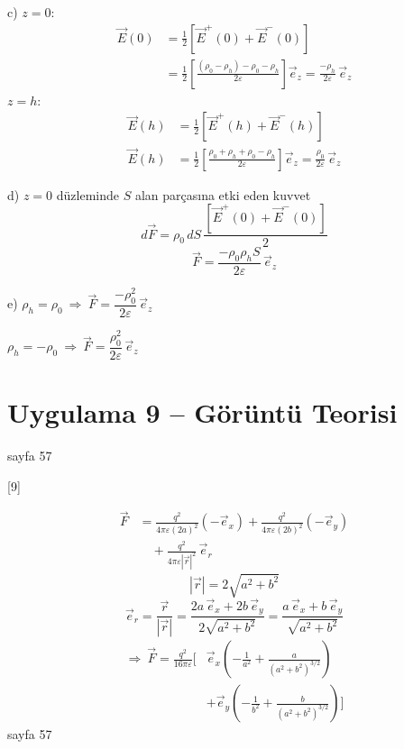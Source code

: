 \documentclass[11pt,a4paper]{article}
\begin{document}
c) $z=0$:
\begin{align*}
\vec E(0)&=\frac12\left[\vec E^{+}(0)+\vec E^{-}(0)\right]\\
&=\frac12\left[\frac{(\rho_0-\rho_h)-\rho_0-\rho_h}{2\varepsilon}\right]\vec e_z=\frac{-\rho_h}{2\varepsilon}\,\vec e_z
\end{align*}
$z=h$:
\begin{align*}
\vec E(h)&=\frac12\left[\vec E^{+}(h)+\vec E^{-}(h)\right]\\
\vec E(h)&=\frac12\left[\frac{\rho_0+\rho_h+\rho_0-\rho_h}{2\varepsilon}\right]\vec e_z=\frac{\rho_0}{2\varepsilon}\,\vec e_z
\end{align*}

d) $z=0$ düzleminde $S$ alan parçasına etki eden kuvvet
\[
d\vec F=\rho_0\,dS\,\frac{\left[\vec E^{+}(0)+\vec E^{-}(0)\right]}{2}
\]
\[
\vec F=\frac{-\rho_0\rho_h S}{2\varepsilon}\,\vec e_z
\]

e) $\rho_h=\rho_0\ \Rightarrow\ \vec F=\dfrac{-\rho_0^{2}}{2\varepsilon}\,\vec e_z$

$\rho_h=-\rho_0\ \Rightarrow\ \vec F=\dfrac{\rho_0^{2}}{2\varepsilon}\,\vec e_z$

\section{Uygulama 9 -- Görüntü Teorisi}
\textcolor{kirmizikalem}{sayfa 57}


[9]

\begin{align*}
\vec F&=\frac{q^{2}}{4\pi\varepsilon(2a)^{2}}(-\vec e_x)+\frac{q^{2}}{4\pi\varepsilon(2b)^{2}}(-\vec e_y)\\
&\quad+\frac{q^{2}}{4\pi\varepsilon|\vec r|^{2}}\,\vec e_r
\end{align*}
\[
|\vec r|=2\sqrt{a^{2}+b^{2}}
\]
\[
\vec e_r=\frac{\vec r}{|\vec r|}=\frac{2a\,\vec e_x+2b\,\vec e_y}{2\sqrt{a^{2}+b^{2}}}=\frac{a\,\vec e_x+b\,\vec e_y}{\sqrt{a^{2}+b^{2}}}
\]
\begin{align*}
\Rightarrow\ \vec F=\frac{q^{2}}{16\pi\varepsilon}\Bigg[&\vec e_x\left(-\frac{1}{a^{2}}+\frac{a}{(a^{2}+b^{2})^{3/2}}\right)\\
&+\vec e_y\left(-\frac{1}{b^{2}}+\frac{b}{(a^{2}+b^{2})^{3/2}}\right)\Bigg]
\end{align*}
\textcolor{kirmizikalem}{sayfa 57}
\end{document}
